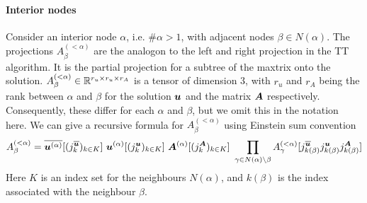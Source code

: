 \documentclass[a4wide]{article}
\begin{document}
\paragraph{Interior nodes}
Consider an interior node $\alpha$, i.e. $\# \alpha > 1$, with adjacent nodes $\beta \in N(\alpha)$.
The projections $A^{(<\alpha)}_\beta$ are the analogon to the left and right projection in the TT algorithm.
It is the partial projection for a subtree of the maxtrix onto the solution.
$A^{(<\alpha)}_\beta \in \mathbb{R}^{r_u \times r_u \times r_A}$ is a tensor of dimension 3, with $r_u$ and $r_A$ being the rank between $\alpha$ and $\beta$ for the solution ${\boldsymbol{u}}$ and the matrix ${\boldsymbol{A}}$ respectively.
Consequently, these differ for each $\alpha$ and $\beta$, but we omit this in the notation here.
We can give a recursive formula for $A^{(<\alpha)}_\beta$ using Einstein sum convention
\begin{equation}
  \label{eq:left_proj}
  A^{(<\alpha)}_\beta
  = \overline{{\boldsymbol{u}}^{(\alpha)}}[(j_k^{\overline{{\boldsymbol{u}}}})_{k \in K}] \
  {\boldsymbol{u}}^{(\alpha)}[(j_k^{{\boldsymbol{u}}})_{k \in K}] \
  {\boldsymbol{A}}^{(\alpha)}[(j_k^{{\boldsymbol{A}}})_{k \in K}] \
  \prod_{\gamma \in N(\alpha) \setminus {\beta}} A^{(<\alpha)}_\gamma[j_{k(\beta)}^{\overline{{\boldsymbol{u}}}} j_{k(\beta)}^{{\boldsymbol{u}}} j_{k(\beta)}^{{\boldsymbol{A}}}]
\end{equation}
Here $K$ is an index set for the neighbours $N(\alpha)$, and $k(\beta)$ is the index associated with the neighbour $\beta$.
\end{document}
